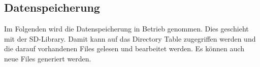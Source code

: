 \newpage
\subsection{Datenspeicherung}
\label{sec:Inbetriebnahme_Datenspeicherung}

Im Folgenden wird die Datenspeicherung in Betrieb genommen. Dies geschieht mit der SD-Library. Damit kann auf das Directory Table zugegriffen werden und die darauf vorhandenen Files gelesen und bearbeitet werden. Es können auch neue Files generiert werden.